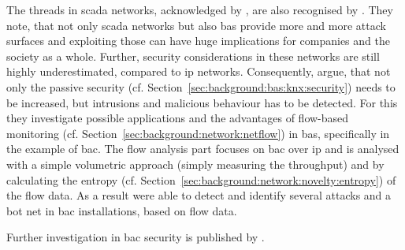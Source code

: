 The threads in \gls{scada} networks, acknowledged by \textcite{Yang2006}, are also recognised by \textcite{Celeda2012}. They note, that not only \gls{scada} networks but also \gls{bas} provide more and more attack surfaces and exploiting those can have huge implications for companies and the society as a whole.
Further, security considerations in these networks are still highly underestimated, compared to \gls{ip} networks.
Consequently, \textcite{Celeda2012} argue, that not only the passive security (cf. Section~\ref{sec:background:bas:knx:security}) needs to be increased, but intrusions and malicious behaviour has to be detected. For this they investigate possible applications and the advantages of flow-based monitoring (cf. Section~\ref{sec:background:network:netflow}) in \gls{bas}, specifically in the example of \gls{bac}.
The flow analysis part focuses on \gls{bac} over \gls{ip} and is analysed with a simple volumetric approach (simply measuring the throughput) and by calculating the entropy (cf. Section~\ref{sec:background:network:novelty:entropy}) of the flow data.
As a result \textcite{Celeda2012} were able to detect and identify several attacks and a bot net in \gls{bac} installations, based on flow data.

Further investigation in \gls{bac} security is published by \textcite{Pan2014}.


